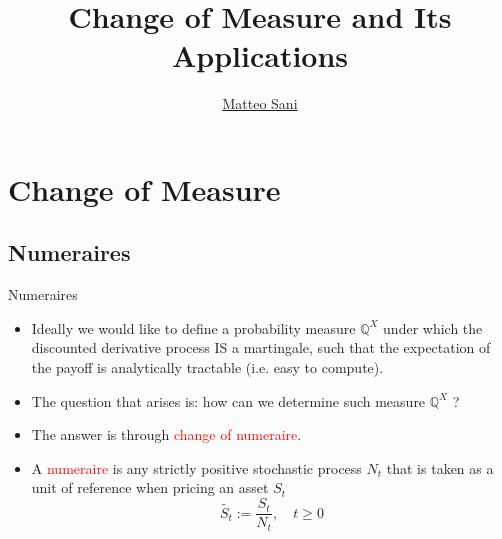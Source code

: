 \documentclass{beamer}
\title{Change of Measure and Its Applications}
\author{\href{mailto:matteo.sani@unisi.it}{Matteo Sani}}
\begin{document}
\begin{frame}[plain]
  \maketitle
\end{frame}

\section{Change of Measure}

\subsection{Numeraires}
\begin{frame}{Numeraires}
  \begin{itemize}
  \item<1-> Ideally we would like to define a probability measure $\mathbb{Q}^X$ under which the discounted derivative process IS a martingale, such that the expectation of the payoff is analytically tractable (i.e. easy to compute).
  \item<2-> The question that arises is: how can we determine such measure $\mathbb{Q}^X$ ?
  \item<3-> The answer is through \textcolor{red}{change of numeraire}.
  \item<4-> A \textcolor{red}{numeraire} is any strictly positive stochastic process $N_t$ that is taken as a unit of reference when pricing an asset $S_t$
    \begin{equation*}
      \tilde{S_t}:=\frac{S_t}{N_t}, \quad t \ge 0
    \end{equation*}
  \end{itemize}
\end{frame}
\end{document}
